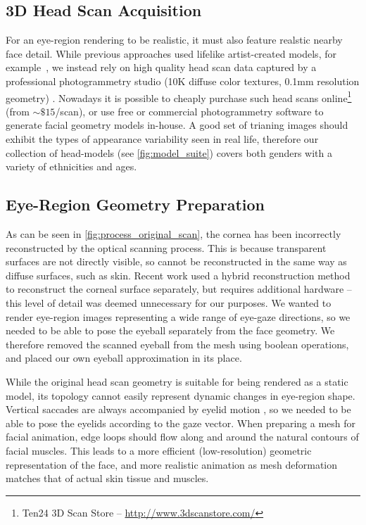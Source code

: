 \subsection{3D Head Scan Acquisition}
\label{sec:eye_region_geom_prep}

For an eye-region rendering to be realistic, it must also feature realstic nearby face detail. While previous approaches used lifelike artist-created models, for example~\cite{swirski2014rendering}, we instead rely on high quality head scan data captured by a professional photogrammetry studio (10K diffuse color textures, 0.1mm resolution geometry) \cite{Ten24}.
Nowadays it is possible to cheaply purchase such head scans online\footnote{Ten24 3D Scan Store -- \url{http://www.3dscanstore.com/}} (from $\sim\!\$15$/scan), or use free or commercial photogrammetry software to generate facial geometry models in-house.
A good set of trianing images should exhibit the types of appearance variability seen in real life, therefore our collection of head-models (see \autoref{fig:model_suite}) covers both genders with a variety of ethnicities and ages.

\subsection{Eye-Region Geometry Preparation}

As can be seen in \autoref{fig:process_original_scan}, the cornea has been incorrectly reconstructed by the optical scanning process.
This is because transparent surfaces are not directly visible, so cannot be reconstructed in the same way as diffuse surfaces, such as skin.
Recent work used a hybrid reconstruction method to reconstruct the corneal surface separately, but requires additional hardware \cite{berard2014highquality} -- this level of detail was deemed unnecessary for our purposes.
We wanted to render eye-region images representing a wide range of eye-gaze directions, so we needed to be able to pose the eyeball separately from the face geometry.
We therefore removed the scanned eyeball from the mesh using boolean operations, and placed our own eyeball approximation in its place.

While the original head scan geometry is suitable for being rendered as a static model, its topology cannot easily represent dynamic changes in eye-region shape.
Vertical saccades are always accompanied by eyelid motion \cite{liversedge2011oxford}, so we needed to be able to pose the eyelids according to the gaze vector.
When preparing a mesh for facial animation, edge loops should flow along and around the natural contours of facial muscles.
This leads to a more efficient (low-resolution) geometric representation of the face, and more realistic animation as mesh deformation matches that of actual skin tissue and muscles.

